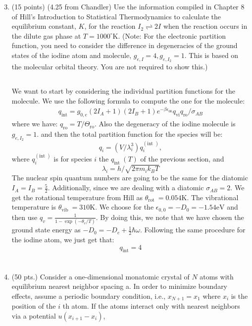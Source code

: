 \documentclass[12pt]{article}
\begin{document}
\begin{enumerate}
  \setcounter{enumi}{2}
  \item (15 points) (4.25 from Chandler) Use the information compiled in Chapter 8 of Hill's Introduction to Statistical Thermodynamics to calculate the equilibrium constant, $K$, for the reaction $I_{2} \rightleftharpoons 2 I$ when the reaction occurs in the dilute gas phase at $T=1000^{\circ} \mathrm{K}$. (Note: For the electronic partition function, you need to consider the difference in degeneracies of the ground states of the iodine atom and molecule, $g_{e, I}=4, g_{e, I_{2}}=1$. This is based on the molecular orbital theory. You are not required to show this.)
\subsection{}
We want to start by considering the individual partition functions for the molecule. We use the following formula to compute the one for the molecule:
\begin{equation}
\begin{aligned}
q_{\mathrm{int}}=g_{0, e}\left(2 I_A+1\right)\left(2 I_B+1\right) e^{-\beta \epsilon_{00}} q_{\mathrm{vi}} q_{\mathrm{ro}} / \sigma_{A B}
\end{aligned}
\end{equation}
where we have:
$q_{\mathrm{ro}}=T / \Theta_{\mathrm{ro}}$. Also the degeneracy of the iodine molecule is $g_{e, I_{2}}=1$. 
and then the total partition function for the species will be:
$$
q_i=\left(V / \lambda_i^3\right) q_i^{(\text {int })},
$$
where $q_i^{(\text {int })}$ is for species $i$ the $q_{\text {int }}(T)$ of the previous section, and
$$
\lambda_i=h / \sqrt{2 \pi m_i k_B T}
$$
The nuclear spin quantum numbers are going to be the same for the diatomic $I_A=I_B=\frac{5}{2}$. Additionally, since we are dealing with a diatomic $\sigma _{A B}=2$. We get the rotational temperature from Hill as $\theta_{\text {rot }}=0.054 \mathrm{K}$. The vibrational temperature is $\theta_{\text {vib }}=310 \mathrm{K}$. We choose for the $\epsilon_{0,0}=-D_0=-1.54 \text{eV}$ and then use $q_v=\frac{1}{1-\exp \left(-\theta_v / T\right)}$. By doing this, we note that we have chosen the ground state energy as $-D_0=-D_e+\frac{1}{2}\hbar\omega $. Following the same procedure for the iodine atom, we just get that:
\begin{equation}
  q_{\text{int}}= 4
\end{equation}
\section{}
  \item (50 pts.) Consider a one-dimensional monatomic crystal of $N$ atoms with equilibrium nearest neighbor spacing a. In order to minimize boundary effects, assume a periodic boundary condition, i.e., $x_{N+1}=x_{1}$ where $x_{i}$ is the position of the $i$ th atom. If the atoms interact only with nearest neighbors via a potential $u\left(x_{i+1}-x_{i}\right)$,

\end{enumerate}
\end{document}
